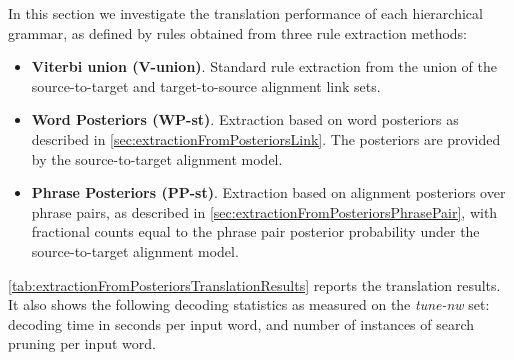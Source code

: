 In this section we investigate the translation performance of each hierarchical
grammar, as defined by rules obtained from three rule extraction methods:
%
\begin{itemize}
  \item {\bf Viterbi union (V-union)}. Standard rule extraction from the union
    of the source-to-target and target-to-source alignment link sets. %
  \item {\bf Word Posteriors (WP-st)}. Extraction based on word posteriors as
    described in \autoref{sec:extractionFromPosteriorsLink}. The posteriors
    are provided by the source-to-target alignment model.
  \item {\bf Phrase Posteriors (PP-st)}. Extraction based on alignment
    posteriors over phrase pairs, as described in
    \autoref{sec:extractionFromPosteriorsPhrasePair}, with fractional counts
    equal to the phrase pair posterior probability under the source-to-target
    alignment model.
\end{itemize}
%
\autoref{tab:extractionFromPosteriorsTranslationResults} reports the
translation results. It also shows the following decoding statistics as measured
on the {\em tune-nw} set: decoding time in seconds per input word, and number of
instances of search pruning per input word.
%
